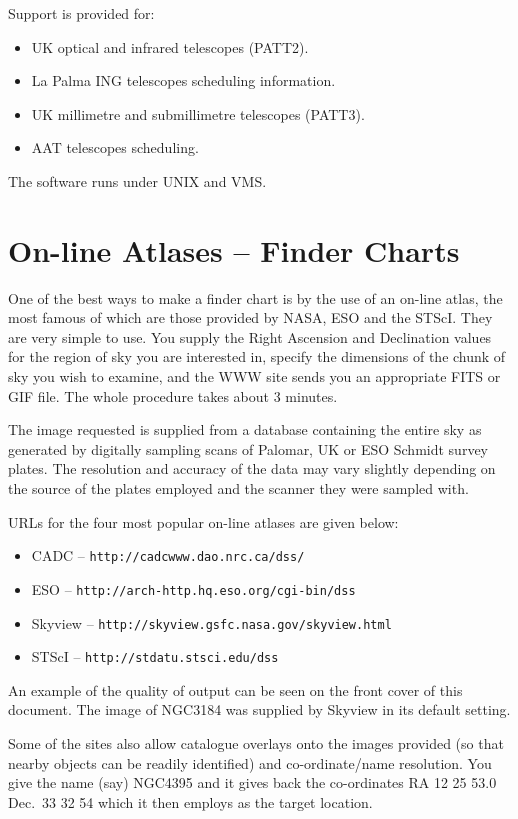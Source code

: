 \documentclass[twoside,11pt]{article}
\newcommand{\htmladdnormallink}[2]{#1}
\newcommand{\xlabel}[1]{}
\newcommand{\CADCref}{\htmladdnormallink{\tt http://cadcwww.dao.nrc.ca/dss/}{http://cadcwww.dao.nrc.ca/dss/}}
\newcommand{\HTTPDref}{\htmladdnormallink{\tt http://skyview.gsfc.nasa.gov/skyview.html}{http://skyview.gsfc.nasa.gov/skyview.html}}
\newcommand{\HTTPEref}{\htmladdnormallink{\tt http://arch-http.hq.eso.org/cgi-bin/dss}{http://arch-http.hq.eso.org/cgi-bin/dss}}
\newcommand{\HTTPFref}{\htmladdnormallink{\tt http://stdatu.stsci.edu/dss}{http://stdatu.stsci.edu/dss}}
\begin{document}
Support is provided for:

\begin{itemize}
\item UK optical and infrared telescopes (PATT2).
\item La Palma ING telescopes scheduling information.
\item UK millimetre and submillimetre telescopes (PATT3).
\item AAT telescopes scheduling.
\end{itemize}

The software runs under UNIX and VMS.

\section{On-line Atlases -- Finder Charts} \xlabel{ATLASES}
\label{sec:atlases}

One of the best ways to make a finder chart is by the use of an on-line
atlas, the most famous of which are those provided by NASA, ESO and the STScI.
They are very simple to use. You supply the Right Ascension and Declination values for the region
of sky you are interested in, specify the dimensions of the chunk of
sky you wish to examine, and the WWW site sends you an appropriate FITS or GIF
file. The whole procedure takes about 3 minutes.

The image requested is supplied
from a database containing the entire sky as generated by digitally sampling
scans of Palomar, UK or ESO Schmidt survey plates. The resolution and accuracy of the data may
vary slightly depending on the source of the plates employed and the scanner
they were sampled with.

URLs for the four most popular on-line atlases are given below:

\begin{itemize}
\item CADC -- {\CADCref}
\item ESO -- {\HTTPEref}
\item Skyview -- {\HTTPDref}
\item STScI -- {\HTTPFref}
\end{itemize}

An example of the quality of output can be seen on the front cover of this document.
The image of NGC3184 was supplied by Skyview in its default setting.

Some of the sites also allow catalogue overlays onto the images provided
(so that nearby objects can be readily identified)
and co-ordinate/name resolution.
You give the name (say) NGC4395 and
it gives back the co-ordinates  RA 12 25 53.0  Dec.\ 33 32 54 which it
then employs as the target location.
\end{document}
